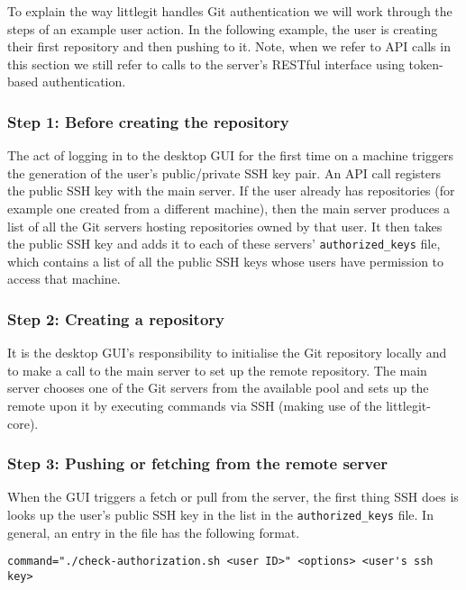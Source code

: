 To explain the way littlegit handles Git authentication we will work through the steps of an example user action. In the following example, the user is creating their first repository and then pushing to it. Note, when we refer to API calls in this section we still refer to calls to the server's RESTful interface using token-based authentication.

\subsubsection{Step 1: Before creating the repository}

The act of logging in to the desktop GUI for the first time on a machine triggers the generation of the user's public/private SSH key pair. An API call registers the public SSH key with the main server. If the user already has repositories (for example one created from a different machine), then the main server produces a list of all the Git servers hosting repositories owned by that user. It then takes the public SSH key and adds it to each of these servers'  \texttt{authorized\_keys} file, which contains a list of all the public SSH keys whose users have permission to access that machine.

\subsubsection{Step 2: Creating a repository}
 
It is the desktop GUI's responsibility to initialise the Git repository locally and to make a call to the main server to set up the remote repository. The main server chooses one of the Git servers from the available pool and sets up the remote upon it by executing commands via SSH (making use of the littlegit-core).

\subsubsection{Step 3: Pushing or fetching from the remote server}

When the GUI triggers a fetch or pull from the server, the first thing SSH does is looks up the user's public SSH key in the list in the \texttt{authorized\_keys} file. In general, an entry in the file has the following format.

\begin{verbatim}
command="./check-authorization.sh <user ID>" <options> <user's ssh key>
\end{verbatim}

